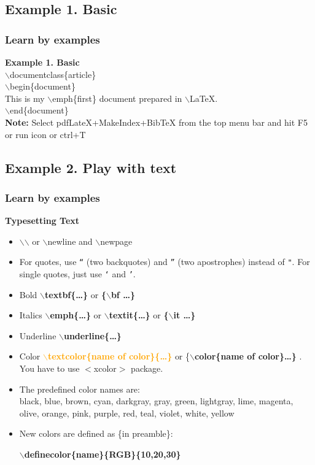 \documentclass [9pt] {beamer}
\begin{document}
\subsection{Example 1. Basic}\label{Example 1. Basic}
\begin{frame}\frametitle{Learn by examples}
\rm
\fontsize{9pt}{11pt}\selectfont

\textbf{Example 1. Basic}\\[.30cm]

$\backslash$documentclass\{article\}\\
$\backslash$begin\{document\}\\
This is my $\backslash$emph\{first\} document prepared in $\backslash$LaTeX.\\
$\backslash$end\{document\}\\[0.5cm]

\textbf{Note:} Select pdfLateX+MakeIndex+BibTeX from the top menu bar and hit F5 or run icon or ctrl+T
\end{frame}

\subsection{Example 2. Play with text}\label{Example 2. Play with text}

\begin{frame}\frametitle{Learn by examples}
\rm
\fontsize{9pt}{11pt}\selectfont

\textbf{Typesetting Text}\\[.30cm]
\begin{itemize}
\item $\backslash$$\backslash$ or $\backslash$newline and $\backslash$newpage
\item For quotes, use {\tt ``} (two backquotes) and {\tt ''} (two
apostrophes) instead of {\tt "}. For single quotes, just use
\texttt{`} and \texttt{'}.
\item Bold  \textbf{$\backslash$textbf\{\dots\}} or \textbf{\{$\backslash$bf \dots\}}
\item Italics \textbf{$\backslash$emph\{\dots\}} or \textbf{$\backslash$textit\{\dots\}} or \textbf{\{$\backslash$it \dots\}}
\item Underline \textbf{$\backslash$underline\{\dots\} }
\item Color \textcolor{orange}{\textbf{$\backslash$textcolor\{name of color\}\{\dots\} }} or {\color{red}\{{\textbf{$\backslash$color\{name of color\}\dots\} }}}. You have to use $<$xcolor$>$ package.
\item The predefined color names are:\\

black, blue, brown, cyan, darkgray, gray, green, lightgray, lime, magenta, olive, orange, pink, purple, red, teal, violet, white, yellow
\item New colors are defined as \{in preamble\}:

\textbf{$\backslash$definecolor\{name\}\{RGB\}\{10,20,30\}}

\end{itemize}
\end{frame}
\end{document}
